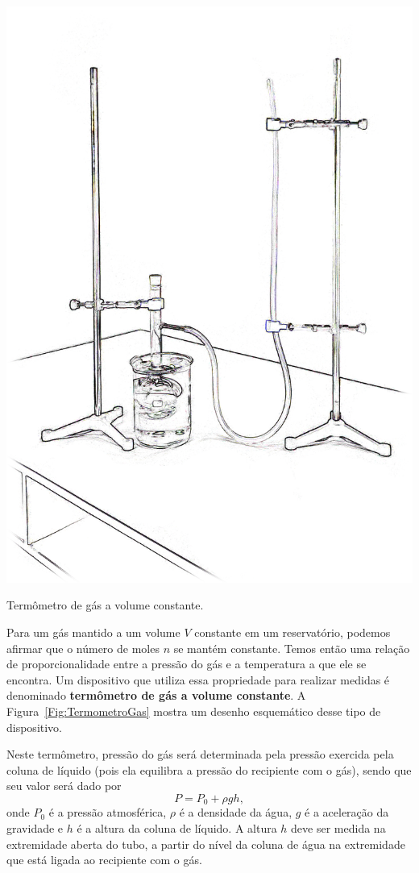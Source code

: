 \begin{marginfigure}
\centering
\includegraphics[width=\textwidth]{Ilustrations/Term_gas.png}
\caption{Termômetro de gás a volume constante.}
\label{Fig:TermometroGas}
\end{marginfigure}
Para um gás mantido a um volume $V$ constante em um reservatório, podemos afirmar que o número de moles $n$ se mantém constante. Temos então uma relação de proporcionalidade entre a pressão do gás e a temperatura a que ele se encontra. Um dispositivo que utiliza essa propriedade para realizar medidas é denominado \textbf{termômetro de gás a volume constante}. A Figura~\ref{Fig:TermometroGas} mostra um desenho esquemático desse tipo de dispositivo.

Neste termômetro, pressão do gás será determinada pela pressão exercida pela coluna de líquido (pois ela equilibra a pressão do recipiente com o gás), sendo que seu valor será dado por
\begin{equation}
	P = P_0 + \rho g h,
\end{equation}
%
onde $P_0$ é a pressão atmosférica, $\rho$ é a densidade da água, $g$ é a aceleração da gravidade e $h$ é a altura da coluna de líquido. A altura $h$ deve ser medida na extremidade aberta do tubo, a partir do nível da coluna de água na extremidade que está ligada ao recipiente com o gás.

